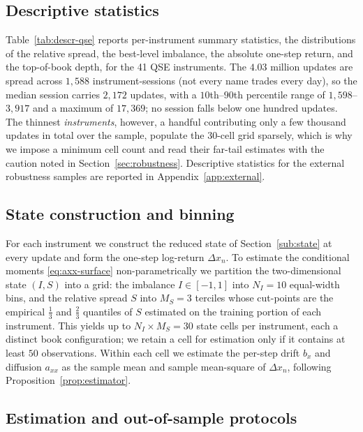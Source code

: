 \documentclass[11pt]{article}
\theoremstyle{plain}
\theoremstyle{definition}
\newcommand{\axx}{a_{xx}}
\begin{document}
\subsection{Descriptive statistics}
\label{sub:descriptive}
Table~\ref{tab:descr-qse} reports per-instrument summary statistics, the
distributions of the relative spread, the best-level imbalance, the absolute one-step
return, and the top-of-book depth, for the 41 QSE instruments. The $4.03$ million updates
are spread across $1{,}588$ instrument-sessions (not every name trades every day), so the median
session carries $2{,}172$ updates, with a $10$th--$90$th percentile range of
$1{,}598$--$3{,}917$ and a maximum of $17{,}369$; no session falls below one hundred updates.
The thinnest \emph{instruments}, however, a handful contributing only a few thousand updates
in total over the sample, populate the $30$-cell grid sparsely, which is why we impose a
minimum cell count and read their far-tail estimates with the caution noted in
Section~\ref{sec:robustness}. Descriptive statistics for the external robustness samples are
reported in Appendix~\ref{app:external}.

\FloatBarrier

\subsection{State construction and binning}
\label{sub:binning}

For each instrument we construct the reduced state of Section~\ref{sub:state} at
every update and form the one-step log-return $\Delta x_n$. To estimate the
conditional moments \eqref{eq:axx-surface} non-parametrically we partition the
two-dimensional state $(I,S)$ into a grid: the imbalance $I\in[-1,1]$ into
$N_I=10$ equal-width bins, and the relative spread $S$ into $M_S=3$ terciles whose
cut-points are the empirical $\tfrac13$ and $\tfrac23$ quantiles of $S$ estimated
on the training portion of each instrument. This yields up to $N_I\times M_S=30$
state cells per instrument, each a distinct book configuration; we retain a cell
for estimation only if it contains at least $50$ observations. Within each cell we
estimate the per-step drift $b_x$ and diffusion $\axx$ as the sample mean and
sample mean-square of $\Delta x_n$, following Proposition~\ref{prop:estimator}.

\subsection{Estimation and out-of-sample protocols}
\label{sub:protocols}
\end{document}
